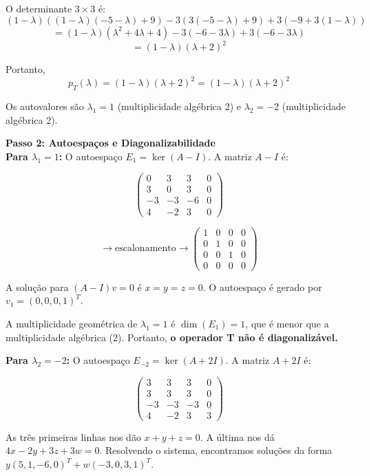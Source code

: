 O determinante $3 \times 3$ é:
\[
(1-\lambda)((1-\lambda)(-5-\lambda)+9) - 3(3(-5-\lambda)+9) + 3(-9+3(1-\lambda))
\]
\[
= (1-\lambda)(\lambda^2+4\lambda+4) - 3(-6-3\lambda) + 3(-6-3\lambda)
\]
\[
= (1-\lambda)(\lambda+2)^2
\]

Portanto,
\[
p_T(\lambda) = (1-\lambda)(\lambda+2)^2 = (1-\lambda)(\lambda+2)^2
\]

Os autovalores são $\lambda_1 = 1$ (multiplicidade algébrica 2) e $\lambda_2 = -2$ (multiplicidade algébrica 2).

\bigskip

\textbf{Passo 2: Autoespaços e Diagonalizabilidade} \\

\textbf{Para $\lambda_1 = 1$:} O autoespaço $E_1 = \ker(A - I)$. A matriz $A - I$ é:

\[
\begin{pmatrix}
0 & 3 & 3 & 0 \\
3 & 0 & 3 & 0 \\
-3 & -3 & -6 & 0 \\
4 & -2 & 3 & 0
\end{pmatrix}
\]

\[
\longrightarrow \text{escalonamento} \longrightarrow
\begin{pmatrix}
1 & 0 & 0 & 0 \\
0 & 1 & 0 & 0 \\
0 & 0 & 1 & 0 \\
0 & 0 & 0 & 0
\end{pmatrix}
\]

A solução para $(A-I)v=0$ é $x=y=z=0$. O autoespaço é gerado por $v_1 = (0,0,0,1)^T$.

A multiplicidade geométrica de $\lambda_1 = 1$ é $\dim(E_1) = 1$, que é menor que a multiplicidade algébrica (2). Portanto, \textbf{o operador T não é diagonalizável.}

\bigskip

\textbf{Para $\lambda_2 = -2$:} O autoespaço $E_{-2} = \ker(A+2I)$. A matriz $A+2I$ é:

\[
\begin{pmatrix}
3 & 3 & 3 & 0 \\
3 & 3 & 3 & 0 \\
-3 & -3 & -3 & 0 \\
4 & -2 & 3 & 3
\end{pmatrix}
\]

As três primeiras linhas nos dão $x+y+z=0$. A última nos dá $4x-2y+3z+3w=0$. Resolvendo o sistema, encontramos soluções da forma $y(5,1,-6,0)^T + w(-3,0,3,1)^T$.

